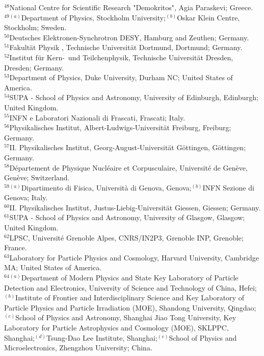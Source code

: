\begin{flushleft}
$^{48}$National Centre for Scientific Research "Demokritos", Agia Paraskevi; Greece.\\
$^{49}$$^{(a)}$Department of Physics, Stockholm University;$^{(b)}$Oskar Klein Centre, Stockholm; Sweden.\\
$^{50}$Deutsches Elektronen-Synchrotron DESY, Hamburg and Zeuthen; Germany.\\
$^{51}$Fakult\"{a}t Physik , Technische Universit{\"a}t Dortmund, Dortmund; Germany.\\
$^{52}$Institut f\"{u}r Kern-~und Teilchenphysik, Technische Universit\"{a}t Dresden, Dresden; Germany.\\
$^{53}$Department of Physics, Duke University, Durham NC; United States of America.\\
$^{54}$SUPA - School of Physics and Astronomy, University of Edinburgh, Edinburgh; United Kingdom.\\
$^{55}$INFN e Laboratori Nazionali di Frascati, Frascati; Italy.\\
$^{56}$Physikalisches Institut, Albert-Ludwigs-Universit\"{a}t Freiburg, Freiburg; Germany.\\
$^{57}$II. Physikalisches Institut, Georg-August-Universit\"{a}t G\"ottingen, G\"ottingen; Germany.\\
$^{58}$D\'epartement de Physique Nucl\'eaire et Corpusculaire, Universit\'e de Gen\`eve, Gen\`eve; Switzerland.\\
$^{59}$$^{(a)}$Dipartimento di Fisica, Universit\`a di Genova, Genova;$^{(b)}$INFN Sezione di Genova; Italy.\\
$^{60}$II. Physikalisches Institut, Justus-Liebig-Universit{\"a}t Giessen, Giessen; Germany.\\
$^{61}$SUPA - School of Physics and Astronomy, University of Glasgow, Glasgow; United Kingdom.\\
$^{62}$LPSC, Universit\'e Grenoble Alpes, CNRS/IN2P3, Grenoble INP, Grenoble; France.\\
$^{63}$Laboratory for Particle Physics and Cosmology, Harvard University, Cambridge MA; United States of America.\\
$^{64}$$^{(a)}$Department of Modern Physics and State Key Laboratory of Particle Detection and Electronics, University of Science and Technology of China, Hefei;$^{(b)}$Institute of Frontier and Interdisciplinary Science and Key Laboratory of Particle Physics and Particle Irradiation (MOE), Shandong University, Qingdao;$^{(c)}$School of Physics and Astronomy, Shanghai Jiao Tong University, Key Laboratory for Particle Astrophysics and Cosmology (MOE), SKLPPC, Shanghai;$^{(d)}$Tsung-Dao Lee Institute, Shanghai;$^{(e)}$School of Physics and Microelectronics, Zhengzhou University; China.\\
$$
\end{flushleft}
